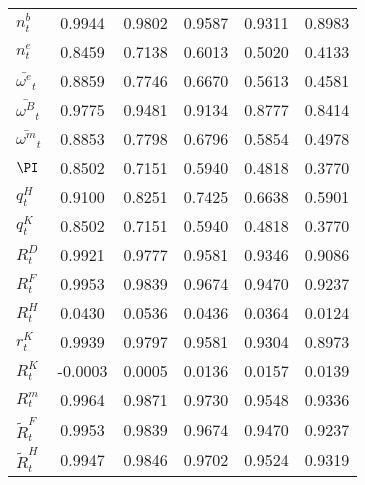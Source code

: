 \begin{center}
\begin{longtable}{lccccc}
$ n^b_t                     $	 & 	        0.9944	 & 	        0.9802	 & 	        0.9587	 & 	        0.9311	 & 	        0.8983 \\ 
$ n^e_t                     $	 & 	        0.8459	 & 	        0.7138	 & 	        0.6013	 & 	        0.5020	 & 	        0.4133 \\ 
$ \bar{\omega^e}_t          $	 & 	        0.8859	 & 	        0.7746	 & 	        0.6670	 & 	        0.5613	 & 	        0.4581 \\ 
$ \bar{\omega^B}_t          $	 & 	        0.9775	 & 	        0.9481	 & 	        0.9134	 & 	        0.8777	 & 	        0.8414 \\ 
$ \bar{\omega^m}_t          $	 & 	        0.8853	 & 	        0.7798	 & 	        0.6796	 & 	        0.5854	 & 	        0.4978 \\ 
$ \PI                       $	 & 	        0.8502	 & 	        0.7151	 & 	        0.5940	 & 	        0.4818	 & 	        0.3770 \\ 
$ q^H_t                     $	 & 	        0.9100	 & 	        0.8251	 & 	        0.7425	 & 	        0.6638	 & 	        0.5901 \\ 
$  q^K_t                    $	 & 	        0.8502	 & 	        0.7151	 & 	        0.5940	 & 	        0.4818	 & 	        0.3770 \\ 
$  R^D_t                    $	 & 	        0.9921	 & 	        0.9777	 & 	        0.9581	 & 	        0.9346	 & 	        0.9086 \\ 
$ R^F_t                     $	 & 	        0.9953	 & 	        0.9839	 & 	        0.9674	 & 	        0.9470	 & 	        0.9237 \\ 
$   R^H_t                   $	 & 	        0.0430	 & 	        0.0536	 & 	        0.0436	 & 	        0.0364	 & 	        0.0124 \\ 
$ r^K_t                     $	 & 	        0.9939	 & 	        0.9797	 & 	        0.9581	 & 	        0.9304	 & 	        0.8973 \\ 
$  R^K_t                    $	 & 	       -0.0003	 & 	        0.0005	 & 	        0.0136	 & 	        0.0157	 & 	        0.0139 \\ 
$  R^m_t                    $	 & 	        0.9964	 & 	        0.9871	 & 	        0.9730	 & 	        0.9548	 & 	        0.9336 \\ 
$  \tilde{R}^F_t            $	 & 	        0.9953	 & 	        0.9839	 & 	        0.9674	 & 	        0.9470	 & 	        0.9237 \\ 
$  \tilde{R}^H_t            $	 & 	        0.9947	 & 	        0.9846	 & 	        0.9702	 & 	        0.9524	 & 	        0.9319 \\ 

\end{longtable}
\end{center}
